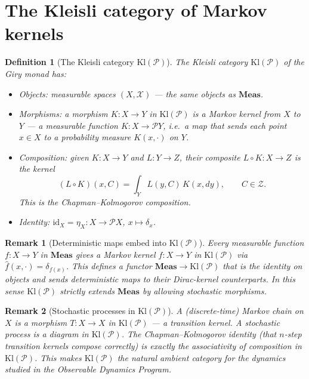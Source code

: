 \documentclass[11pt]{article}
\newtheorem{definition}{Definition}
\newtheorem{remark}{Remark}
\newcommand{\Meas}{\mathbf{Meas}}
\newcommand{\Kl}{\mathrm{Kl}}
\newcommand{\Pcal}{\mathcal{P}}
\newcommand{\Xcal}{\mathcal{X}}
\newcommand{\Zcal}{\mathcal{Z}}
\newcommand{\id}{\mathrm{id}}
\begin{document}
\section{The Kleisli category of Markov kernels}\label{sec:kleisli}

\begin{definition}[The Kleisli category $\Kl(\Pcal)$]\label{def:kleisli}
The \emph{Kleisli category} $\Kl(\Pcal)$ of the Giry monad has:
\begin{itemize}
  \item \emph{Objects}: measurable spaces $(X, \Xcal)$ --- the same objects
    as $\Meas$.
  \item \emph{Morphisms}: a morphism $K : X \to Y$ in $\Kl(\Pcal)$ is a
    \emph{Markov kernel} from $X$ to $Y$ --- a measurable function
    $K : X \to \Pcal Y$, i.e.\ a map that sends each point $x \in X$ to a
    probability measure $K(x, \cdot)$ on $Y$.
  \item \emph{Composition}: given $K : X \to Y$ and $L : Y \to Z$, their
    composite $L \circ K : X \to Z$ is the kernel
    \[
      (L \circ K)(x, C) = \int_Y L(y, C)\, K(x, dy), \qquad C \in \Zcal.
    \]
    This is the \emph{Chapman--Kolmogorov} composition.
  \item \emph{Identity}: $\id_X = \eta_X : X \to \Pcal X$, $x \mapsto \delta_x$.
\end{itemize}
\end{definition}

\begin{remark}[Deterministic maps embed into $\Kl(\Pcal)$]
Every measurable function $f : X \to Y$ in $\Meas$ gives a Markov kernel
$\hat{f} : X \to Y$ in $\Kl(\Pcal)$ via $\hat{f}(x, \cdot) = \delta_{f(x)}$.
This defines a functor $\Meas \to \Kl(\Pcal)$ that is the identity on objects
and sends deterministic maps to their Dirac-kernel counterparts.  In this sense
$\Kl(\Pcal)$ strictly extends $\Meas$ by allowing stochastic morphisms.
\end{remark}

\begin{remark}[Stochastic processes in $\Kl(\Pcal)$]
A (discrete-time) \emph{Markov chain} on $X$ is a morphism
$T : X \to X$ in $\Kl(\Pcal)$ --- a transition kernel.  A \emph{stochastic
process} is a diagram in $\Kl(\Pcal)$.  The Chapman--Kolmogorov identity
(that $n$-step transition kernels compose correctly) is exactly the
associativity of composition in $\Kl(\Pcal)$.  This makes $\Kl(\Pcal)$ the
natural ambient category for the dynamics studied in the Observable Dynamics
Program.
\end{remark}
\end{document}
